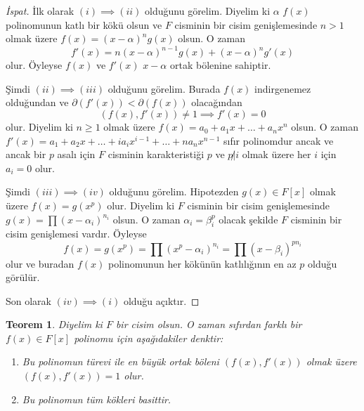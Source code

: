 \documentclass{article}
\newtheorem{thm}{Teorem}[section]
\theoremstyle{definition}
\theoremstyle{remark}
\begin{document}
    	    \begin{proof}[İspat]
    	        İlk olarak $(i) \implies (ii)$ olduğunu görelim. Diyelim ki $\alpha$ $f(x)$ polinomunun katlı bir kökü olsun ve $F$ cisminin bir cisim genişlemesinde $n > 1$ olmak üzere $f(x) = (x - \alpha)^ng(x)$ olsun. O zaman
    	        \begin{equation*}
    	            f'(x) = n(x - \alpha)^{n - 1}g(x) + (x - \alpha)^ng'(x)
    	        \end{equation*}
    	        olur. Öyleyse $f(x)$ ve $f'(x)$ $x - \alpha$ ortak bölenine sahiptir.\par
    	        Şimdi $(ii) \implies (iii)$ olduğunu görelim. Burada $f(x)$ indirgenemez olduğundan ve $\partial(f'(x)) < \partial(f(x))$ olacağından
    	        \begin{equation*}
    	            (f(x), f'(x)) \neq 1 \implies f'(x) = 0
    	        \end{equation*}
    	        olur. Diyelim ki $n \geq 1$ olmak üzere $f(x) = a_0 + a_1x + \dots + a_nx^n$ olsun. O zaman $f'(x) = a_1 + a_2x + \dots + ia_ix^{i - 1} + \dots + na_nx^{n - 1}$ sıfır polinomdur ancak ve ancak bir $p$ asalı için $F$ cisminin karakteristiği $p$ ve $p \not| i$ olmak üzere her $i$ için $a_i = 0$ olur.\par
    	        Şimdi $(iii) \implies (iv)$ olduğunu görelim. Hipotezden $g(x) \in F[x]$ olmak üzere $f(x) = g(x^p)$ olur. Diyelim ki $F$ cisminin bir cisim genişlemesinde $g(x) = \prod{(x - \alpha_i)^{n_i}}$ olsun. O zaman $\alpha_i = \beta_i^p$ olacak şekilde $F$ cisminin bir cisim genişlemesi vardır. Öyleyse
    	        \begin{equation*}
    	            f(x) = g(x^p) = \prod{(x^p - \alpha_i)^{n_i}} = \prod{(x - \beta_i)^{pn_i}}
    	        \end{equation*}
    	        olur ve buradan $f(x)$ polinomunun her kökünün katlılığının en az $p$ olduğu görülür.\par
    	        Son olarak $(iv) \implies (i)$ olduğu açıktır.
    	    \end{proof}
    	    
    	    \begin{thm}
    	        Diyelim ki $F$ bir cisim olsun. O zaman sıfırdan farklı bir $f(x) \in F[x]$ polinomu için aşağıdakiler denktir:
    	        \begin{enumerate}
				\renewcommand{\labelenumi}{(\roman{enumi})}
				    \item Bu polinomun türevi ile en büyük ortak böleni $(f(x), f'(x))$ olmak üzere $(f(x), f'(x)) = 1$ olur.
				    \item Bu polinomun tüm kökleri basittir.
				\end{enumerate}
    	    \end{thm}
    	    
\end{document}
